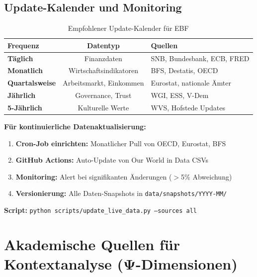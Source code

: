 \subsection{Update-Kalender und Monitoring}

\begin{table}[htbp]
\centering
\caption{Empfohlener Update-Kalender für EBF}
\label{tab:dr-update-calendar}
\renewcommand{\arraystretch}{1.3}
\begin{tabular}{@{}lcl@{}}
\toprule
\textbf{Frequenz} & \textbf{Datentyp} & \textbf{Quellen} \\
\midrule
\textbf{Täglich} & Finanzdaten & SNB, Bundesbank, ECB, FRED \\
\textbf{Monatlich} & Wirtschaftsindikatoren & BFS, Destatis, OECD \\
\textbf{Quartalsweise} & Arbeitsmarkt, Einkommen & Eurostat, nationale Ämter \\
\textbf{Jährlich} & Governance, Trust & WGI, ESS, V-Dem \\
\textbf{5-Jährlich} & Kulturelle Werte & WVS, Hofstede Updates \\
\bottomrule
\end{tabular}
\end{table}

\begin{tcolorbox}[colback=yellow!5!white, colframe=yellow!75!black,
    title=\textbf{Automatisierungs-Empfehlung}]

\textbf{Für kontinuierliche Datenaktualisierung:}
\begin{enumerate}[nosep]
    \item \textbf{Cron-Job einrichten:} Monatlicher Pull von OECD, Eurostat, BFS
    \item \textbf{GitHub Actions:} Auto-Update von Our World in Data CSVs
    \item \textbf{Monitoring:} Alert bei signifikanten Änderungen ($>$5\% Abweichung)
    \item \textbf{Versionierung:} Alle Daten-Snapshots in \texttt{data/snapshots/YYYY-MM/}
\end{enumerate}

\textbf{Script:} \texttt{python scripts/update\_live\_data.py --sources all}

\end{tcolorbox}


\section{Akademische Quellen für Kontextanalyse (Ψ-Dimensionen)}
\label{sec:dr-academic-context}

